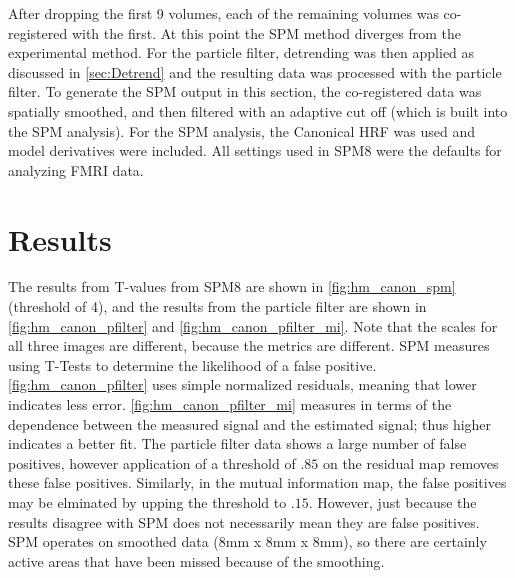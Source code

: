 After dropping the first 9 volumes, each of the remaining volumes was
co-registered with the first. At this point the SPM method
diverges from the experimental method. For the particle filter, detrending 
was then applied as discussed in \autoref{sec:Detrend} and the resulting
data was processed with the particle filter. To generate the SPM output
in this section, the co-registered data was spatially smoothed,
and then filtered with an adaptive cut off (which is built into the
SPM analysis). For the SPM analysis, the Canonical HRF was used
and model derivatives were included. All settings used in SPM8 were the defaults
for analyzing FMRI data.

\section{Results}
The results from T-values from SPM8 are shown in \autoref{fig:hm_canon_spm} (threshold of
4), and the results from 
the particle filter are shown in \autoref{fig:hm_canon_pfilter} and \autoref{fig:hm_canon_pfilter_mi}.
Note that the scales for all three images are different, because the metrics are different.
SPM measures using T-Tests to determine the likelihood of a false positive. \autoref{fig:hm_canon_pfilter}
uses simple normalized residuals, meaning that lower indicates less error.  
\autoref{fig:hm_canon_pfilter_mi} measures in terms of the dependence between the 
measured signal and the estimated signal; thus higher indicates a better fit. The particle
filter data shows a large number of false positives, however application of a threshold
of $.85$ on the residual map removes these false positives. Similarly, in the mutual information
map, the false positives may be elminated by upping the threshold to $.15$. However, just
because the results disagree with SPM does not necessarily mean they are false positives.
SPM operates on smoothed data (8mm x 8mm x 8mm), so there are certainly active 
areas that have been missed because of the smoothing. 

